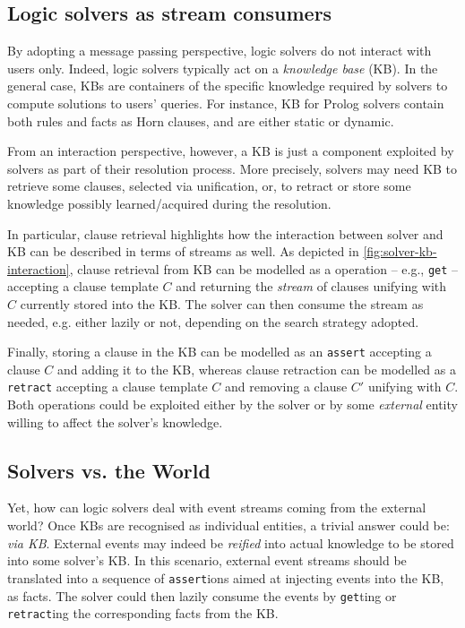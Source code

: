 \documentclass[12pt,a4paper,openright,twoside]{book}
\begin{document}
\subsection{Logic solvers as stream consumers}

By adopting a message passing perspective, logic solvers do not interact with users only.
%
Indeed, logic solvers typically act on a \emph{knowledge base} (KB).
%
In the general case, KBs are containers of the specific knowledge required by solvers to compute solutions to users' queries.
%
For instance, KB for Prolog solvers contain both rules and facts as Horn clauses, and are either static or dynamic.

From an interaction perspective, however, a KB is just a component exploited by solvers as part of their resolution process.
%
More precisely, solvers may need KB to retrieve some clauses, selected via unification, or, to retract or store some knowledge possibly learned/acquired during the resolution.

In particular, clause retrieval highlights how the interaction between solver and KB can be described in terms of streams as well.
%
As depicted in \cref{fig:solver-kb-interaction}, clause retrieval from KB can be modelled as a operation -- e.g., \texttt{get} -- accepting a clause template $C$ and returning the \emph{stream} of clauses unifying with $C$ currently stored into the KB.
%
The solver can then consume the stream as needed, e.g. either lazily or not, depending on the search strategy adopted.

Finally, storing a clause in the KB can be modelled as an \texttt{assert} accepting a clause $C$ and adding it to the KB, whereas clause retraction can be modelled as a \texttt{retract} accepting a clause template $C$ and removing a clause $C'$ unifying with $C$.
%
Both operations could be exploited either by the solver or by some \emph{external} entity willing to affect the solver's knowledge.

\subsection{Solvers vs. the World}

Yet, how can logic solvers deal with event streams coming from the external world?
%
Once KBs are recognised as individual entities, a trivial answer could be: \emph{via KB}.
%
External events may indeed be \emph{reified} into actual knowledge to be stored into some solver's KB.
%
In this scenario, external event streams should be translated into a sequence of \texttt{assert}ions aimed at injecting events into the KB, as facts.
%
The solver could then lazily consume the events by \texttt{get}ting or \texttt{retract}ing the corresponding facts from the KB.
\end{document}
